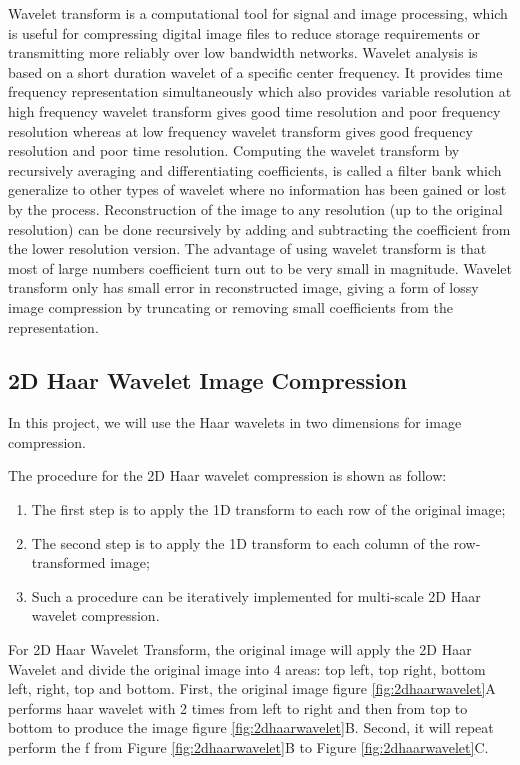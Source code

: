 Wavelet transform \cite{wt} is a computational tool for signal and image processing, which is useful for compressing digital image files to reduce storage requirements or transmitting more reliably over low bandwidth networks. 
Wavelet analysis is based on a short duration wavelet of a specific center frequency. 
It provides time frequency representation simultaneously which also provides variable resolution at high frequency wavelet transform gives good time resolution and poor frequency resolution whereas at low frequency wavelet transform gives good frequency resolution and poor time resolution.
Computing the wavelet transform by recursively averaging and differentiating coefficients, is
called a filter bank which generalize to other types of wavelet where no information has
been gained or lost by the process. 
Reconstruction of the image to any resolution (up to the original resolution) can be done recursively by adding and subtracting the coefficient from the lower resolution version.
The advantage of using wavelet transform is that most of large numbers coefficient
turn out to be very small in magnitude. Wavelet transform only has small error in reconstructed image, giving a form of lossy image compression by truncating or removing small coefficients from
the representation.


\subsection{2D Haar Wavelet Image Compression}
In this project, we will use the Haar wavelets in two dimensions for image compression.

The procedure for the 2D Haar wavelet compression is shown as follow:
\begin{enumerate}
\item The first step is to apply the 1D transform to each row of the original image;
\item  The second step is to apply the 1D transform to each column of the 
row-transformed image;
\item Such a procedure can be iteratively implemented for multi-scale 2D Haar wavelet 
compression.
\end{enumerate}

For 2D Haar Wavelet Transform, the original image will apply the 2D Haar Wavelet and divide the original image into 4 areas: top left, top right, bottom left, right, top and bottom. First, the original image figure \ref{fig:2dhaarwavelet}A performs haar wavelet with 2 times from left to right and then from top to bottom to produce the image figure \ref{fig:2dhaarwavelet}B. 
Second, it will repeat perform the f from Figure \ref{fig:2dhaarwavelet}B to Figure \ref{fig:2dhaarwavelet}C.

